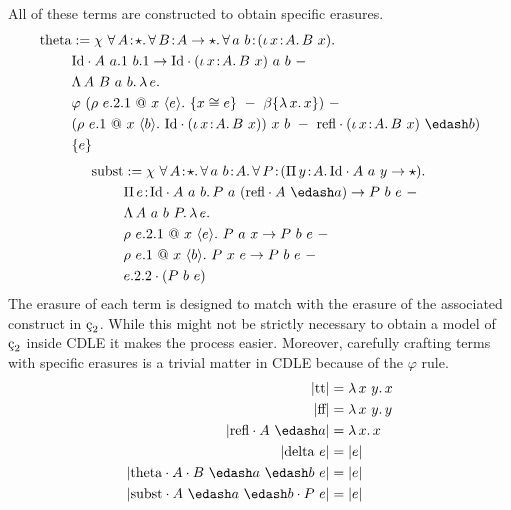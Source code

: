 All of these terms are constructed to obtain specific erasures.
\begin{align*}
    \ctheta &:= \chi\ 
        \abs{\forall}{A}{\star}{
            \abs{\forall}{B}{A \to \star}{
                \abs{\forall}{a\ b}{(\abs{\iota}{x}{A}{B\ x})}{
                    \\ &\cId \cdot A\ a.1\ b.1 \to \cId \cdot (\abs{\iota}{x}{A}{B\ x})\ a\ b
                }
            }
        }\ -
        \\ &\absu{\Lambda}{A\ B\ a\ b}{
            \absu{\lambda}{e}{
                \\ &\varphi\ (\rho\ e.2.1\ @\ x\ \langle e \rangle.\ \{ x \cong e \}\ -\ \beta\{ \absu{\lambda}{x}{x} \})\ -
                \\ &(\rho\ e.1\ @\ x\ \langle b \rangle.\ \cId \cdot (\abs{\iota}{x}{A}{B\ x}))\ x\ b\ -\ \crefl \cdot (\abs{\iota}{x}{A}{B\ x})\ \edash b)
                \\ &\{ e \} 
            }
        }
\end{align*}
\begin{align*}
    \csubst &:= \chi\ 
        \abs{\forall}{A}{\star}{
            \abs{\forall}{a\ b}{A}{
                \abs{\forall}{P}{ (\abs{\Pi}{y}{A}{\cId \cdot A\ a\ y \to \star}) }{
                    \\ &\abs{\Pi}{e}{\cId \cdot A\ a\ b}{
                        P\ a\ (\crefl \cdot A\ \edash a) \to P\ b\ e
                    }
                }
            }
        }\ -
        \\ &\absu{\Lambda}{A\ a\ b\ P}{
            \absu{\lambda}{e}{
                \\ &\rho\ e.2.1\ @\ x\ \langle e \rangle.\ P\ a\ x \to P\ b\ e\ -\
                \\ &\rho\ e.1\ @\ x\ \langle b \rangle.\ P\ x\ e \to P\ b\ e\ -\
                \\ &e.2.2 \cdot (P\ b\ e)
            }
    }
\end{align*}
The erasure of each term is designed to match with the erasure of the associated construct in $\ced$.
While this might not be strictly necessary to obtain a model of $\ced$ inside CDLE it makes the process easier.
Moreover, carefully crafting terms with specific erasures is a trivial matter in CDLE because of the $\varphi$ rule.
\begin{align*}
    |\ctt| &= \absu{\lambda}{x\ y}{x} \\
    |\cff| &= \absu{\lambda}{x\ y}{y} \\
    |\crefl \cdot A\ \edash a| &= \absu{\lambda}{x}{x} \\
    |\cdelta\ e| &= |e| \\
    |\ctheta \cdot A \cdot B\ \edash a\ \edash b\ e| &= |e| \\
    |\csubst \cdot A\ \edash a\ \edash b \cdot P\ e| &= |e|
\end{align*}
